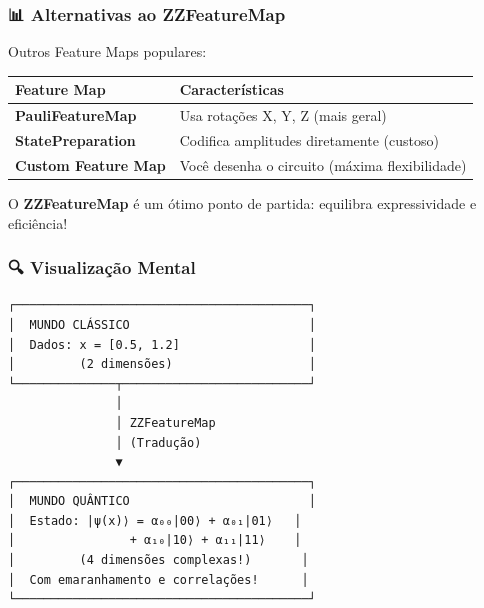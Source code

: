 \documentclass[
  brazilian,
]{report}
\newcounter{none} %
\begin{document}
\subsubsection{📊 Alternativas ao
ZZFeatureMap}\label{alternativas-ao-zzfeaturemap}

Outros Feature Maps populares:

{\def\LTcaptype{none} %
\begin{longtable}[]{@{}
  >{\raggedright\arraybackslash}p{}
  >{\raggedright\arraybackslash}p{}@{}}
\toprule\noalign{}
\begin{minipage}[b]{\linewidth}\raggedright
Feature Map
\end{minipage} & \begin{minipage}[b]{\linewidth}\raggedright
Características
\end{minipage} \\
\midrule\noalign{}
\endhead
\bottomrule\noalign{}
\endlastfoot
\textbf{PauliFeatureMap} & Usa rotações X, Y, Z (mais geral) \\
\textbf{StatePreparation} & Codifica amplitudes diretamente (custoso) \\
\textbf{Custom Feature Map} & Você desenha o circuito (máxima
flexibilidade) \\
\end{longtable}
}

O \textbf{ZZFeatureMap} é um ótimo ponto de partida: equilibra
expressividade e eficiência!

\subsubsection{🔍 Visualização Mental}\label{visualizauxe7uxe3o-mental}

\begin{verbatim}
┌─────────────────────────────────────────┐
│  MUNDO CLÁSSICO                         │
│  Dados: x = [0.5, 1.2]                  │
│         (2 dimensões)                   │
└──────────────┬──────────────────────────┘
               │
               │ ZZFeatureMap
               │ (Tradução)
               ▼
┌─────────────────────────────────────────┐
│  MUNDO QUÂNTICO                         │
│  Estado: |ψ(x)⟩ = α₀₀|00⟩ + α₀₁|01⟩   │
│                + α₁₀|10⟩ + α₁₁|11⟩    │
│         (4 dimensões complexas!)       │
│  Com emaranhamento e correlações!      │
└─────────────────────────────────────────┘
\end{verbatim}
\end{document}
